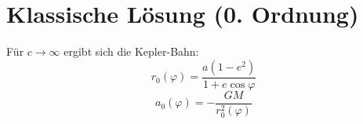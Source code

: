 \section{Klassische Lösung (0. Ordnung)}
Für \( c \to \infty \) ergibt sich die Kepler-Bahn:
\[ r_0(\varphi) = \frac{a(1-e^2)}{1 + e \cos\varphi} \]
\[ a_0(\varphi) = -\frac{GM}{r_0^2(\varphi)} \]
